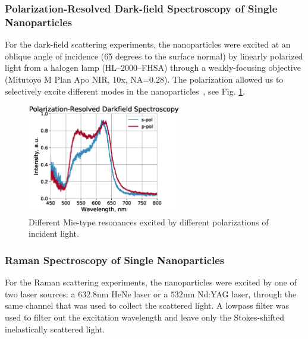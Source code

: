         \subsubsection{Polarization-Resolved Dark-field Spectroscopy of Single Nanoparticles}
            \label{sec:Darkfield}
                For the dark-field scattering experiments, the nanoparticles were excited at an oblique angle of incidence
            (65 degrees to the surface normal) by linearly polarized light from a halogen lamp (HL--2000--FHSA)
            through a weakly-focusing objective (Mitutoyo M Plan Apo NIR, 10x, NA=0.28). The polarization allowed us to
            selectively excite different modes in the nanoparticles~\cite{permyakov2015probing}, see Fig. \ref{fig:PolarizedDF}.

            \begin{figure}[!ht]
                    \begin{center}
                        \includegraphics[width=0.6\textwidth]{figs/methods/DF/id_52780.eps}
                    \end{center}
                    \caption{Different Mie-type resonances excited by different polarizations of incident light.}
                    \label{fig:PolarizedDF}
            \end{figure}

        \subsubsection{Raman Spectroscopy of Single Nanoparticles}
        \label{sec:Raman}
                For the Raman scattering experiments, the nanoparticles were excited by one of two laser sources: a $632.8$nm HeNe laser
            or a $532$nm Nd:YAG laser, through the same channel that was used to collect the scattered light. A lowpass filter was used
            to filter out the excitation wavelength and leave only the Stokes-shifted inelastically scattered light.

